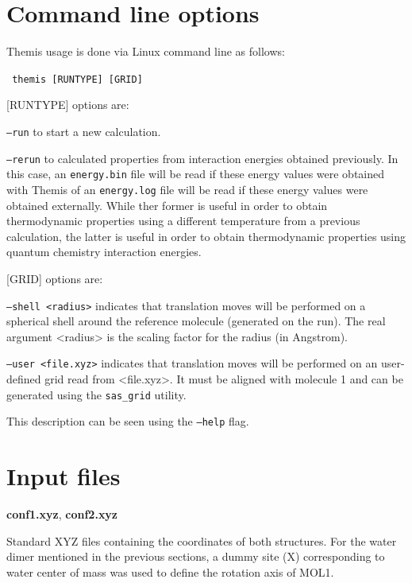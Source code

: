 \documentclass[10pt,a4paper]{report}
\begin{document}
\chapter{Command line options}

  Themis usage is done via Linux command line as follows:

  \texttt{ themis [RUNTYPE] [GRID] }

  [RUNTYPE] options are:

  \texttt{---run} to start a new calculation.

  \texttt{---rerun} to calculated properties from interaction energies obtained previously. 
  In this case, an \texttt{energy.bin} file will be read if these energy values were obtained
  with Themis of an \texttt{energy.log} file will be read if these energy values were obtained
  externally. While ther former is useful in order to obtain thermodynamic properties using 
  a different temperature from a previous calculation, the latter is useful in order to obtain 
  thermodynamic properties using quantum chemistry interaction energies.

  [GRID] options are:

  \texttt{---shell <radius>} indicates that translation moves will be performed on a spherical 
  shell around the reference molecule (generated on the run). The real argument <radius> is the
  scaling factor for the radius (in Angstrom).

  \texttt{---user <file.xyz>} indicates that translation moves will be performed on an 
  user-defined grid read from <file.xyz>. It must be aligned with molecule 1 and can be generated 
  using the \texttt{sas\_grid} utility.

  This description can be seen using the \texttt{---help} flag.

\newpage

\chapter{Input files}

  \textbf{conf1.xyz}, \textbf{conf2.xyz} 
  
  Standard XYZ files containing the
coordinates of both structures. For the water dimer mentioned in the previous
sections, a dummy site (X) corresponding to water center of mass was used to
define the rotation axis of MOL1. \\~
\end{document}
